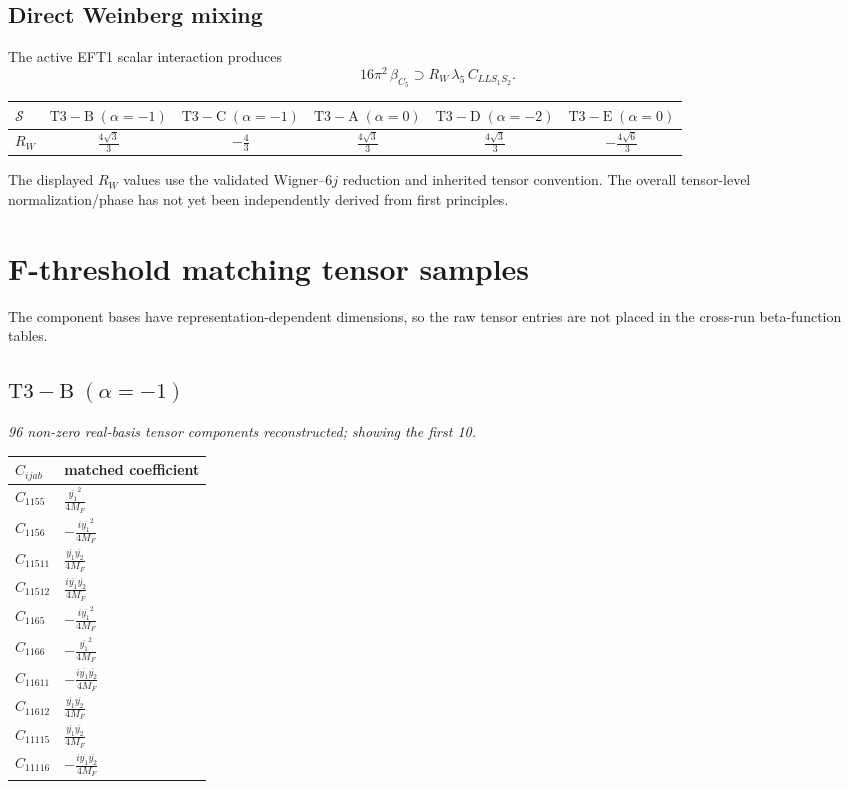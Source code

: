 \documentclass[9pt]{article}
\begin{document}
\subsection*{Direct Weinberg mixing}
The active EFT1 scalar interaction produces
\[16\pi^2\,\beta_{C_5}\supset R_W\,\lambda_5\,C_{LLS_1S_2}.\]
\begin{longtable}{@{}lccccc@{}}
\toprule
$\mathcal{S}$ & $ \mathrm{T3-B}\;(\alpha=-1) $ & $ \mathrm{T3-C}\;(\alpha=-1) $ & $ \mathrm{T3-A}\;(\alpha=0) $ & $ \mathrm{T3-D}\;(\alpha=-2) $ & $ \mathrm{T3-E}\;(\alpha=0) $ \\
\midrule
$R_W$ & $ \frac{4 \sqrt{3}}{3} $ & $ - \frac{4}{3} $ & $ \frac{4 \sqrt{3}}{3} $ & $ \frac{4 \sqrt{3}}{3} $ & $ - \frac{4 \sqrt{6}}{3} $ \\
\bottomrule
\end{longtable}
The displayed $R_W$ values use the validated Wigner--$6j$ reduction and inherited tensor convention.  The overall tensor-level normalization/phase has not yet been independently derived from first principles.
\section*{F-threshold matching tensor samples}
The component bases have representation-dependent dimensions, so the raw tensor entries are not placed in the cross-run beta-function tables.
\subsection*{$ \mathrm{T3-B}\;(\alpha=-1) $}
\textit{96 non-zero real-basis tensor components reconstructed; showing the first 10.}
\begin{longtable}{@{}ll@{}}
\toprule
$C_{ijab}$ & matched coefficient \\
\midrule
$C_{1155}$ & $ \frac{\overline{y_{1}}^{2}}{4 M_F} $ \\
$C_{1156}$ & $ - \frac{i \overline{y_{1}}^{2}}{4 M_F} $ \\
$C_{11511}$ & $ \frac{\overline{y_{1}} \overline{y_{2}}}{4 M_F} $ \\
$C_{11512}$ & $ \frac{i \overline{y_{1}} \overline{y_{2}}}{4 M_F} $ \\
$C_{1165}$ & $ - \frac{i \overline{y_{1}}^{2}}{4 M_F} $ \\
$C_{1166}$ & $ - \frac{\overline{y_{1}}^{2}}{4 M_F} $ \\
$C_{11611}$ & $ - \frac{i \overline{y_{1}} \overline{y_{2}}}{4 M_F} $ \\
$C_{11612}$ & $ \frac{\overline{y_{1}} \overline{y_{2}}}{4 M_F} $ \\
$C_{11115}$ & $ \frac{\overline{y_{1}} \overline{y_{2}}}{4 M_F} $ \\
$C_{11116}$ & $ - \frac{i \overline{y_{1}} \overline{y_{2}}}{4 M_F} $ \\
\bottomrule
\end{longtable}
\end{document}
